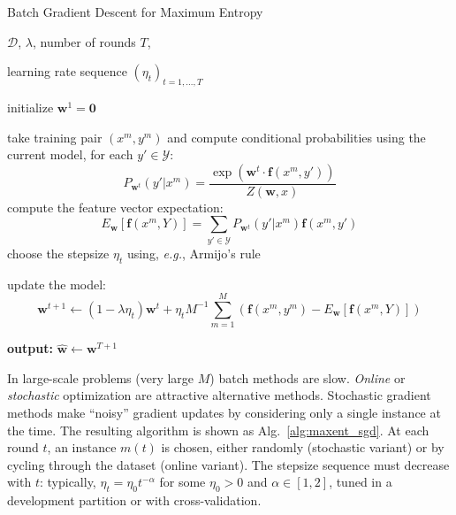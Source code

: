 \begin{algorithm}[t]

   \caption{Batch Gradient Descent for Maximum Entropy \label{alg:maxent_gd}}

\begin{algorithmic}[1]

    $\mathcal{D}$, $\lambda$, number of rounds $T$,

   learning rate sequence $(\eta_t)_{t = 1,\ldots,T}$

   \STATE initialize $\boldsymbol{w}^1 = \mathbf{0}$

	\STATE take training pair $(x^m, y^m)$ and compute conditional probabilities using the current model, for each $y' \in \mathcal{Y}$:
	$$P_{\boldsymbol{w}^t}(y'|x^m) = \frac{\exp(\boldsymbol{w}^t \cdot \boldsymbol{f}(x^m,y'))}{Z(\boldsymbol{w},x)}$$ 
	\STATE compute the feature vector expectation:  
	$$E_{\boldsymbol{w}}[\boldsymbol{f}(x^m,Y)] = \sum_{y' \in \mathcal{Y}} P_{\boldsymbol{w}^t}(y'|x^m) \boldsymbol{f}(x^m,y')$$
	\ENDFOR
	\STATE choose the stepsize $\eta_t$ using, \emph{e.g.}, Armijo's rule

	\STATE update the model: 
	$$\boldsymbol{w}^{t+1} \leftarrow (1-\lambda \eta_t) \boldsymbol{w}^{t} + \eta_t M^{-1} \sum_{m=1}^M \left( \boldsymbol{f}(x^{m},y^{m}) 
	- E_{\boldsymbol{w}}[\boldsymbol{f}(x^{m},Y)]\right)$$
	\ENDFOR

   \STATE \textbf{output:} $\hat{\boldsymbol{w}} \leftarrow \boldsymbol{w}^{T+1}$

\end{algorithmic}

\end{algorithm}

 

In large-scale problems (very large $M$) batch methods are slow. 
\emph{Online} or \emph{stochastic} optimization are attractive alternative methods. Stochastic gradient methods make ``noisy'' gradient updates 
by considering only a single instance at the time. The resulting algorithm is shown as Alg.~\ref{alg:maxent_sgd}. 
At each round $t$, an instance $m(t)$ is chosen, either randomly  (stochastic variant) or by cycling through the dataset (online variant). 
The stepsize sequence must decrease with $t$: typically, $\eta_t = \eta_0 t^{-\alpha}$ for some $\eta_0 > 0$ and $\alpha \in [1, 2]$, tuned 
in a development partition or with cross-validation. 

